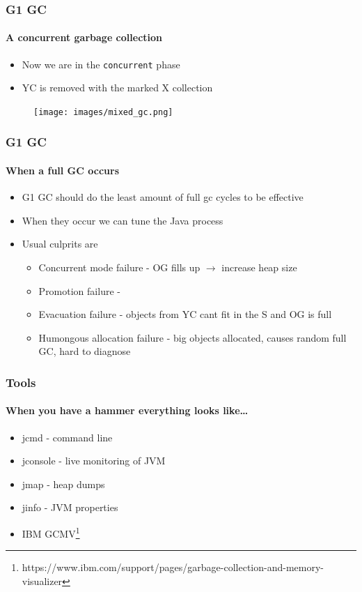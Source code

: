 \documentclass{beamer}
\begin{document}
\begin{frame}

    \frametitle{G1 GC}
    \framesubtitle{A concurrent garbage collection}
    \begin{itemize}
        \item Now we are in the \texttt{concurrent} phase
        \item YC is removed with the marked X collection 
    \end{itemize}
    \begin{figure}
        \texttt{[image: images/mixed\_gc.png]}
    \end{figure}
\end{frame}

\begin{frame}
    \frametitle{G1 GC}
    \framesubtitle{When a full GC occurs}
    \begin{itemize}
        \item G1 GC should do the least amount of full gc cycles to be effective 
        \item When they occur we can tune the Java process
        \item Usual culprits are 
        \begin{itemize}
            \item Concurrent mode failure - OG fills up $\rightarrow$ increase heap size
            \item Promotion failure - 
            \item Evacuation failure - objects from YC cant fit in the S and OG is full
            \item Humongous allocation failure - big objects allocated, causes random full GC, hard to diagnose
        \end{itemize}
    \end{itemize}

\end{frame}
\begin{frame}
    \frametitle{Tools}
    \framesubtitle{When you have a hammer everything looks like\dots}
    \begin{itemize}
        \item jcmd - command line 
        \item jconsole - live monitoring of JVM 
        \item jmap - heap dumps 
        \item jinfo - JVM properties
        \item IBM GCMV\footnote{https://www.ibm.com/support/pages/garbage-collection-and-memory-visualizer}
    \end{itemize}
\end{frame}
\end{document}
